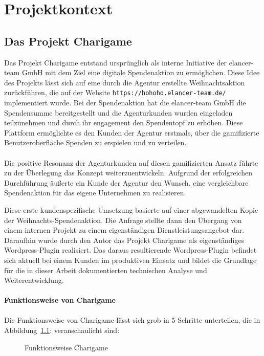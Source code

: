 \chapter{Projektkontext}

\section{Das Projekt Charigame}

Das Projekt Charigame entstand ursprünglich als interne Initiative der elancer-team GmbH mit dem Ziel eine digitale Spendenaktion zu ermöglichen.
Diese Idee des Projekts lässt sich auf eine durch die Agentur erstellte Weihnachtsaktion zurückführen, die auf der Website \texttt{https://hohoho.elancer-team.de/} implementiert wurde.
Bei der Spendenaktion hat die elancer-team GmbH die Spendensumme bereitgestellt und die Agenturkunden wurden eingeladen teilzunehmen und durch ihr engagement den Spendentopf zu erhöhen.
Diese Plattform ermöglichte es den Kunden der Agentur erstmals, über die gamifizierte Benutzeroberfläche Spenden zu erspielen und zu verteilen.
\\\\
Die positive Resonanz der Agenturkunden auf diesen gamifizierten Ansatz führte zu der Überlegung das Konzept weiterzuentwickeln.
Aufgrund der erfolgreichen Durchführung äußerte ein Kunde der Agentur den Wunsch, eine vergleichbare Spendenaktion für das eigene Unternehmen zu realisieren.

Diese erste kundenspezifische Umsetzung basierte auf einer abgewandelten Kopie der Weihnachts-Spendenaktion.
Die Anfrage stellte dann den Übergang von einem internen Projekt zu einem eigenständigen Dienstleistungsangebot dar.
Daraufhin wurde durch den Autor das Projekt Charigame als eigenständiges Wordpress-Plugin realisiert.
Das daraus resultierende Wordpress-Plugin befindet sich aktuell bei einem Kunden im produktiven Einsatz und bildet die Grundlage für die in dieser Arbeit dokumentierten technischen Analyse und Weiterentwicklung.
\\\\
\textbf{Funktionsweise von Charigame}
\\\\
Die Funktionsweise von Charigame lässt sich grob in 5 Schritte unterteilen, die in Abbildung~\ref{fig:charigame-funktion}: veranschaulicht sind:

\begin{figure}[tbh]
    \centering
    
    \caption{Funktionsweise Charigame}
    \label{fig:charigame-funktion}
\end{figure}
\newpage

